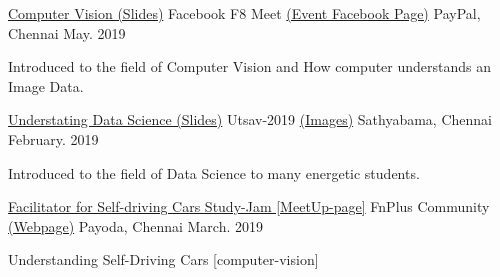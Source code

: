 

\begin{cventries}

  \cventry
    {\href{https://drive.google.com/open?id=1XLCqSRE-P-LMPQzdwLWByMmrcNU182jQ}{Computer Vision (Slides)}} %
    {Facebook F8 Meet \href{https://www.facebook.com/photo.php?fbid=2579103935451961&set=oa.2275368379449013&type=3&theater&ifg=1}{(Event Facebook Page)}} %
    {PayPal, Chennai} %
    {May. 2019} %
    {
      \begin{cvitems} %
        \item {Introduced to the field of Computer Vision and How computer understands an Image Data. }
      \end{cvitems}
    }


  \cventry
    {\href{https://drive.google.com/file/d/1lLDBsU1gFQ10r5X5_tnFzOceWMK0CriR/view?usp=sharing}{Understating Data Science (Slides)}} %
    {Utsav-2019 \href{https://photos.app.goo.gl/3ZDVgiYmo56ZnNbQ6}{(Images)}} %
    {Sathyabama, Chennai} %
    {February. 2019} %
    {
      \begin{cvitems} %
        \item {Introduced to the field of Data Science to many energetic students. }
      \end{cvitems}
    }


  \cventry
    {\href{https://www.meetup.com/geek-meetup-chennai/events/259322931/}{Facilitator for Self-driving Cars Study-Jam [MeetUp-page]}} %
    {FnPlus Community \href{https://www.fnplus.tech/}{(Webpage)}} %
    {Payoda, Chennai} %
    {March. 2019} %
    {
      \begin{cvitems} %
        \item {Understanding Self-Driving Cars [computer-vision]}
      \end{cvitems}
    }


\end{cventries}

